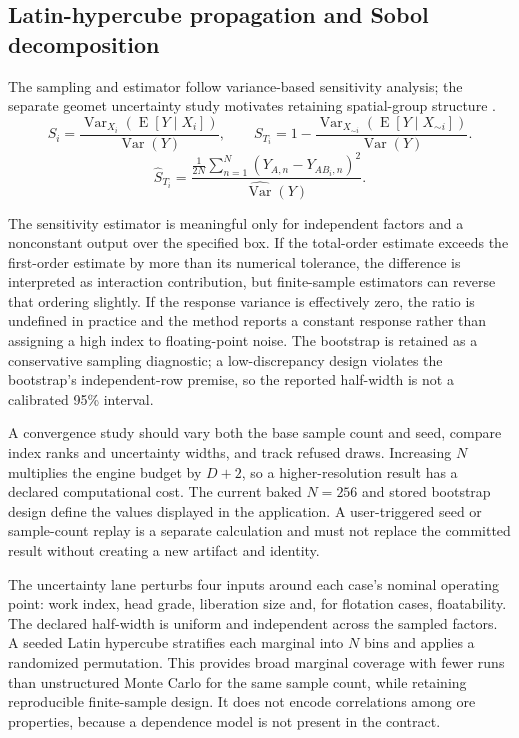 \documentclass[10pt]{article}
\begin{document}
\subsection{Latin-hypercube propagation and Sobol
decomposition}\label{latin-hypercube-propagation-and-sobol-decomposition}

\label{method-sobol}

The sampling and estimator follow variance-based sensitivity analysis;
the separate geomet uncertainty study motivates retaining spatial-group
structure \cite{saltelli2010,herman2017,hoffimann2022}. \begin{equation}
S_i=\frac{\operatorname{Var}_{X_i}(\operatorname{E}[Y\mid X_i])}{\operatorname{Var}(Y)},
\qquad
S_{T_i}=1-\frac{\operatorname{Var}_{X_{\sim i}}(\operatorname{E}[Y\mid X_{\sim i}])}{\operatorname{Var}(Y)}.
\end{equation} \begin{equation}
\widehat{S}_{T_i}=
\frac{\frac{1}{2N}\sum_{n=1}^{N}(Y_{A,n}-Y_{AB_i,n})^2}{\widehat{\operatorname{Var}}(Y)}.
\end{equation}

The sensitivity estimator is meaningful only for independent factors and
a nonconstant output over the specified box. If the total-order estimate
exceeds the first-order estimate by more than its numerical tolerance,
the difference is interpreted as interaction contribution, but
finite-sample estimators can reverse that ordering slightly. If the
response variance is effectively zero, the ratio is undefined in
practice and the method reports a constant response rather than
assigning a high index to floating-point noise. The bootstrap is
retained as a conservative sampling diagnostic; a low-discrepancy design
violates the bootstrap's independent-row premise, so the reported
half-width is not a calibrated 95\% interval.

A convergence study should vary both the base sample count and seed,
compare index ranks and uncertainty widths, and track refused draws.
Increasing \(N\) multiplies the engine budget by \(D+2\), so a
higher-resolution result has a declared computational cost. The current
baked \(N=256\) and stored bootstrap design define the values displayed
in the application. A user-triggered seed or sample-count replay is a
separate calculation and must not replace the committed result without
creating a new artifact and identity.

The uncertainty lane perturbs four inputs around each case's nominal
operating point: work index, head grade, liberation size and, for
flotation cases, floatability. The declared half-width is uniform and
independent across the sampled factors. A seeded Latin hypercube
stratifies each marginal into \(N\) bins and applies a randomized
permutation. This provides broad marginal coverage with fewer runs than
unstructured Monte Carlo for the same sample count, while retaining
reproducible finite-sample design. It does not encode correlations among
ore properties, because a dependence model is not present in the
contract.
\end{document}
